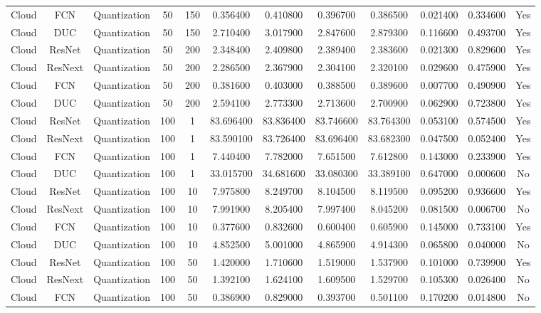 \begin{tabular}{|c||c||c||c||c||c||c||c||c||c||c||c|}
Cloud & FCN & Quantization & 50 & 150 & 0.356400 & 0.410800 & 0.396700 & 0.386500 & 0.021400 & 0.334600 & Yes \\
Cloud & DUC & Quantization & 50 & 150 & 2.710400 & 3.017900 & 2.847600 & 2.879300 & 0.116600 & 0.493700 & Yes \\
Cloud & ResNet & Quantization & 50 & 200 & 2.348400 & 2.409800 & 2.389400 & 2.383600 & 0.021300 & 0.829600 & Yes \\
Cloud & ResNext & Quantization & 50 & 200 & 2.286500 & 2.367900 & 2.304100 & 2.320100 & 0.029600 & 0.475900 & Yes \\
Cloud & FCN & Quantization & 50 & 200 & 0.381600 & 0.403000 & 0.388500 & 0.389600 & 0.007700 & 0.490900 & Yes \\
Cloud & DUC & Quantization & 50 & 200 & 2.594100 & 2.773300 & 2.713600 & 2.700900 & 0.062900 & 0.723800 & Yes \\
Cloud & ResNet & Quantization & 100 & 1 & 83.696400 & 83.836400 & 83.746600 & 83.764300 & 0.053100 & 0.574500 & Yes \\
Cloud & ResNext & Quantization & 100 & 1 & 83.590100 & 83.726400 & 83.696400 & 83.682300 & 0.047500 & 0.052400 & Yes \\
Cloud & FCN & Quantization & 100 & 1 & 7.440400 & 7.782000 & 7.651500 & 7.612800 & 0.143000 & 0.233900 & Yes \\
Cloud & DUC & Quantization & 100 & 1 & 33.015700 & 34.681600 & 33.080300 & 33.389100 & 0.647000 & 0.000600 & No \\
Cloud & ResNet & Quantization & 100 & 10 & 7.975800 & 8.249700 & 8.104500 & 8.119500 & 0.095200 & 0.936600 & Yes \\
Cloud & ResNext & Quantization & 100 & 10 & 7.991900 & 8.205400 & 7.997400 & 8.045200 & 0.081500 & 0.006700 & No \\
Cloud & FCN & Quantization & 100 & 10 & 0.377600 & 0.832600 & 0.600400 & 0.605900 & 0.145000 & 0.733100 & Yes \\
Cloud & DUC & Quantization & 100 & 10 & 4.852500 & 5.001000 & 4.865900 & 4.914300 & 0.065800 & 0.040000 & No \\
Cloud & ResNet & Quantization & 100 & 50 & 1.420000 & 1.710600 & 1.519000 & 1.537900 & 0.101000 & 0.739900 & Yes \\
Cloud & ResNext & Quantization & 100 & 50 & 1.392100 & 1.624100 & 1.609500 & 1.529700 & 0.105300 & 0.026400 & No \\
Cloud & FCN & Quantization & 100 & 50 & 0.386900 & 0.829000 & 0.393700 & 0.501100 & 0.170200 & 0.014800 & No \\

\end{tabular}
